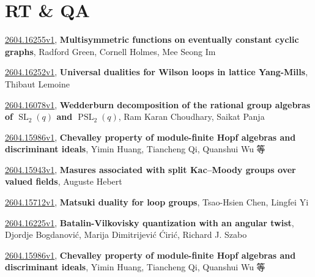 \documentclass[9pt, a4paper]{article}
\theoremstyle{plain}
\theoremstyle{definition}
\theoremstyle{remark}
\newcommand{\arxiv}[3]{\href{https://arxiv.org/abs/#1}{#1}, \textbf{\textcolor{arxivblue}{#2}}, #3}
\begin{document}

\section{RT \& QA}
\arxiv{2604.16255v1}{Multisymmetric functions on eventually constant cyclic graphs}{Radford Green, Cornell Holmes, Mee Seong Im}

\arxiv{2604.16252v1}{Universal dualities for Wilson loops in lattice Yang-Mills}{Thibaut Lemoine}

\arxiv{2604.16078v1}{Wedderburn decomposition of the rational group algebras of $\operatorname{SL}_2(q)$ and $\operatorname{PSL}_2(q)$}{Ram Karan Choudhary, Saikat Panja}

\arxiv{2604.15986v1}{Chevalley property of module-finite Hopf algebras and discriminant ideals}{Yimin Huang, Tiancheng Qi, Quanshui Wu 等}

\arxiv{2604.15943v1}{Masures associated with split Kac--Moody groups over valued fields}{Auguste Hebert}

\arxiv{2604.15712v1}{Matsuki duality for loop groups}{Tsao-Hsien Chen, Lingfei Yi}

\arxiv{2604.16225v1}{Batalin-Vilkovisky quantization with an angular twist}{Djordje Bogdanović, Marija Dimitrijević Ćirić, Richard J. Szabo}

\arxiv{2604.15986v1}{Chevalley property of module-finite Hopf algebras and discriminant ideals}{Yimin Huang, Tiancheng Qi, Quanshui Wu 等}

\end{document}
